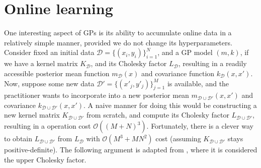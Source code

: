 \section{Online learning}\label{onlinelearningsection}
One interesting aspect of GPs is its ability to accumulate online data in a relatively simple manner, provided we do not change its hyperparameters. Consider fixed an initial data $\mathcal{D} = \{(x_i,y_i)\}_{i=1}^N$, and a GP model $(m,k)$, if we have a kernel matrix $K_{\mathcal{D}}$, and its Cholesky factor $L_{\mathcal{D}}$, resulting in a readily accessible posterior mean function $m_\mathcal{D}(x)$ and covariance function $k_\mathcal{D}(x,x')$. Now, suppose some new data $\mathcal{D}' = \{(x'_j,y'_j)\}_{j=1}^M$ is available, and the practitioner wants to incorporate into a new posterior mean $m_{\mathcal{D} \cup \mathcal{D}'}(x,x')$ and covariance $k_{\mathcal{D} \cup \mathcal{D}'}(x,x')$. A naive manner for doing this would be constructing a new kernel matrix $K_{\mathcal{D} \cup \mathcal{D}'}$ from scratch, and compute its Cholesky factor $L_{\mathcal{D} \cup \mathcal{D}'}$, resulting in a operation cost $\mathcal{O}((M + N)^3)$. Fortunately, there is a clever way to obtain $L_{\mathcal{D} \cup \mathcal{D}'}$ from $L_\mathcal{D}$ with $\mathcal{O}(M^3 + MN^2)$ cost (assuming $K_{\mathcal{D} \cup \mathcal{D}'}$ stays positive-definite). The following argument is adapted from \cite{Osborne_2012}, where it is considered the upper Cholesky factor.

